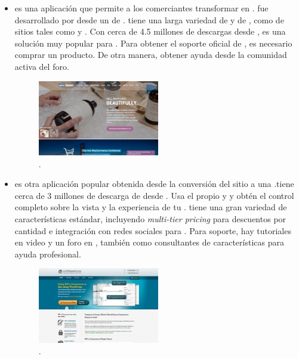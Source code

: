 \begin{itemize}
	\item \textbf{\nameWooCommerce} es una aplicación \ecommerce \free \opensource que permite a los comerciantes transformar \wordPress \sites en \stores. \nameWooCommerce fue desarrollado por \wooThemes desde un \fork de \nameJigoshop. \nameWooCommerce tiene una larga variedad de  \plugins y  \themes de \wooThemes, como de sitios \thirdParty tales como \themeForest \cite{online_ThemeForest} y \codeCanyon \cite{online_CodeCanyon}. Con cerca de 4.5 millones de descargas desde \wordPressOrg\cite{online_WordPress}, \nameWooCommerce es una solución \ecommerce muy popular para \wordPress. Para obtener el soporte oficial de \wooThemes, es necesario comprar un producto. De otra manera, obtener ayuda desde la comunidad activa del foro.

	\begin{figure}[H]
		\centering
		\includegraphics[width=0.5\textwidth]{figuras/cap1/WooCommerceWebsite.jpg}
		\caption{\nameWooCommerce \website\cite{online_WooCommerce}.}
	\end{figure}

	\item \textbf{\nameWPECommerce} es otra aplicación popular obtenida desde la conversión del  sitio \wordPress a una \ecommerce \store.\nameWPECommerce tiene cerca de 3 millones de descarga de \plugin desde \wordPressOrg\cite{online_WordPress}. Usa el propio \html y \css y obtén el control completo sobre la vista y la experiencia de tu \online \store. \nameWPECommerce tiene una gran variedad de características estándar, incluyendo \textit{ multi-tier pricing} para descuentos por cantidad e integración con redes sociales para \marketing. Para soporte, hay tutoriales en video y un foro en \wordPressOrg, también como consultantes de características para ayuda profesional.

	\begin{figure}[H]
		\centering
		\includegraphics[width=0.5\textwidth]{figuras/cap1/WPECommerceWebsite.jpg}
		\caption{\nameWPECommerce \website\cite{online_WPECommerce}.}
	\end{figure}


\end{itemize}
